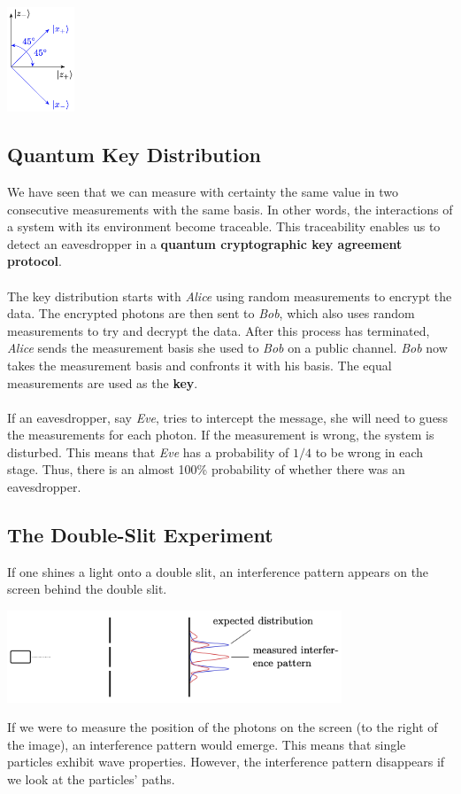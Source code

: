 \documentclass{article}
\begin{document}
\begin{center}
	\includegraphics[width=2cm]{quantum_jump.png}
\end{center}

\subsection{Quantum Key Distribution}
We have seen that we can measure with certainty the same value in two consecutive measurements with the same basis. In other words, the interactions of a system with its environment become traceable. This traceability enables us to detect an eavesdropper in a \textbf{quantum cryptographic key agreement protocol}. \\ \\
The key distribution starts with \textit{Alice} using random measurements to encrypt the data. The encrypted photons are then sent to \textit{Bob}, which also uses random measurements to try and decrypt the data. After this process has terminated, \textit{Alice} sends the measurement basis she used to \textit{Bob} on a public channel. \textit{Bob} now takes the measurement basis and confronts it with his basis. The equal measurements are used as the \textbf{key}. \\ \\
If an eavesdropper, say \textit{Eve}, tries to intercept the message, she will need to guess the measurements for each photon. If the measurement is wrong, the system is disturbed. This means that \textit{Eve} has a probability of $1/4$ to be wrong in each stage. Thus, there is an almost 100\% probability of whether there was an eavesdropper.

\subsection{The Double-Slit Experiment}
If one shines a light onto a double slit, an interference pattern appears on the screen behind the double slit.

\begin{center}
	\includegraphics[width=10cm]{assets/double_slit.png}
\end{center}
If we were to measure the position of the photons on the screen (to the right of the image), an interference pattern would emerge. This means that single particles exhibit wave properties. However, the interference pattern disappears if we look at the particles' paths.
\end{document}
